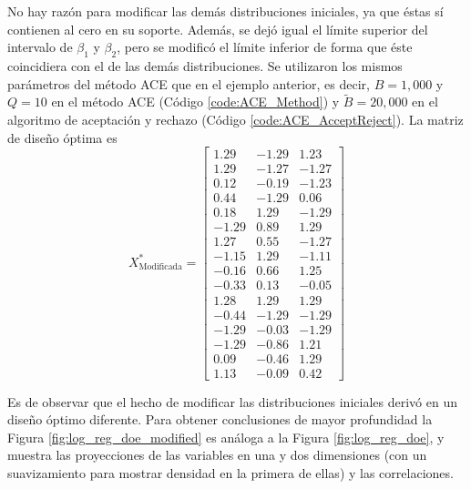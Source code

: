 No hay razón para modificar las demás distribuciones iniciales, ya que éstas sí contienen al cero en su soporte. Además, se dejó igual el límite superior del intervalo de $\beta_1$ y $\beta_2$, pero se modificó el límite inferior de forma que éste coincidiera con el de las demás distribuciones. Se utilizaron los mismos parámetros del método ACE que en el ejemplo anterior, es decir, $B=1,000$ y $Q = 10$ en el método ACE (Código \ref{code:ACE_Method}) y $\tilde{B} = 20,000$ en el algoritmo de aceptación y rechazo (Código \ref{code:ACE_AcceptReject}). La matriz de diseño óptima es
\begin{equation} \label{eq:logistic_regression_opt_design_modified}
	X_{\text{Modificada}}^{*} = \begin{bmatrix}
			    1.29 & -1.29 &  1.23 \\
			    1.29 & -1.27 & -1.27 \\
			    0.12 & -0.19 & -1.23 \\
			    0.44 & -1.29 &  0.06 \\
			    0.18 &  1.29 & -1.29 \\
			   -1.29 &  0.89 &  1.29 \\
			    1.27 &  0.55 & -1.27 \\
			   -1.15 &  1.29 & -1.11\\
			   -0.16 &  0.66 &  1.25\\
			   -0.33 &  0.13 & -0.05 \\
			    1.28 &  1.29 &  1.29 \\
			   -0.44 & -1.29 & -1.29 \\
			   -1.29 & -0.03 & -1.29 \\
			   -1.29 & -0.86 &  1.21 \\
			    0.09 & -0.46 &  1.29 \\
			    1.13 & -0.09 &  0.42
	      \end{bmatrix}
\end{equation}

Es de observar que el hecho de modificar las distribuciones iniciales derivó en un diseño óptimo diferente. Para obtener conclusiones de mayor profundidad la Figura \ref{fig:log_reg_doe_modified} es análoga a la Figura \ref{fig:log_reg_doe}, y muestra las proyecciones de las variables en una y dos dimensiones (con un suavizamiento para mostrar densidad en la primera de ellas) y las correlaciones. \\







